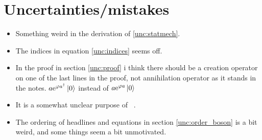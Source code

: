 \section{Uncertainties/mistakes}

\begin{itemize}
\item Something weird in the derivation of \eqref{unc:statmech}.
\item The indices in equation \eqref{unc:indices} seems off.  
\item In the proof in section \ref{unc:proof} i think there should be a creation operator on one of the last lines in the proof, not annihilation operator as it stands in the notes. $a\mathrm{e}^{\varphi a^\dagger}\ket{0}$ instead of $a\mathrm{e}^{\varphi a}\ket{0}$
\item It is a somewhat unclear purpose of ~. 
\item The ordering of headlines and equations in section \ref{unc:order_boson} is a bit weird, and some things seem a bit unmotivated. 

\end{itemize}